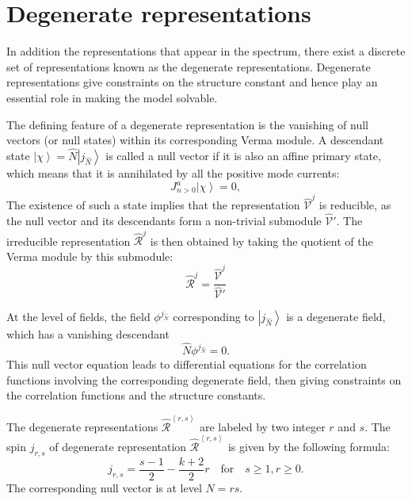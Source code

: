 \documentclass[10pt,a4paper]{article}
\numberwithin{equation}{section}
\newcommand{\ket}[1]{\left| #1 \right\rangle}
\newcommand{\vev}[1]{\left\langle #1 \right\rangle}
\begin{document}
\section{Degenerate representations}
In addition the representations that appear in the spectrum, there exist a discrete set of representations known as the 
degenerate representations. Degenerate representations give constraints on the structure constant and hence play an essential role in 
making the model solvable. 

The defining feature of a degenerate representation is the vanishing of null vectors (or null states) within its corresponding Verma module.
A descendant state $\ket{\chi} = \hat{N} \ket{j_{\hat{N}}} $ is called a null vector if it is also an affine primary state, which means 
that it is annihilated by all the positive mode currents:
\begin{equation}
    J^{a}_{n>0} \ket{\chi} = 0, \label{nullvectoreq}
\end{equation}
The existence of such a state implies that the representation $\widehat{\mathcal{V}}^{j}$ is reducible, 
as the null vector and its descendants form a non-trivial submodule $\widehat{\mathcal{V}}'$. 
The irreducible representation $\widehat{\mathcal{R}}^{j}$ is then obtained by taking the quotient of the Verma module by this submodule:
\begin{equation}
    \widehat{\mathcal{R}}^{j} = \frac{\widehat{\mathcal{V}}^{j}}{ \widehat{\mathcal{V}}'}
\end{equation}

At the level of fields, the field $\phi^{j_{\hat{N}}}$ corresponding to
$\ket{j_{\hat{N}}}$ is a degenerate field, which has a vanishing descendant 
\begin{equation}
    \hat{N} \phi^{j_{\hat{N}}} = 0.
\end{equation}
This null vector equation leads to differential equations for the correlation functions involving the corresponding degenerate field, then 
giving constraints on the correlation functions and the structure constants. 

The degenerate representations $\widehat{\mathcal{R}}^{\vev{r,s}}$ are labeled by two integer $r$ and $s$. The spin $j_{r,s}$ of 
degenerate representation $\widehat{\mathcal{R}}^{\vev{r,s}}$ is given by the following formula: 
\begin{equation}
    j_{r,s} = \frac{s-1}{2} - \frac{k+2}{2} r \quad \mathrm{for} \quad s\geq 1, r \geq 0.
\end{equation}
The corresponding null vector is at level $N=rs$.
\end{document}
